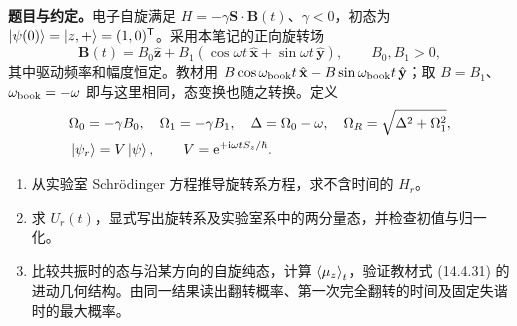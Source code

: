 \textbf{题目与约定。}电子自旋满足 $H=-\gamma\mathbf S\cdot\mathbf B(t)$、$\gamma<0$，初态为 $\left|\psi(0)\right\rangle=\left|z,+\right\rangle=(1,0)^{\mathsf T}$。采用本笔记的正向旋转场
\begin{equation}
  \mathbf B(t)=B_0\hat{\mathbf z}
    +B_1(\cos\omega t\,\hat{\mathbf x}+\sin\omega t\,\hat{\mathbf y}),
  \qquad B_0,B_1>0,
\end{equation}
其中驱动频率和幅度恒定。教材用 $B\cos\omega_{\rm book}t\,\hat{\mathbf x}-B\sin\omega_{\rm book}t\,\hat{\mathbf y}$；取 $B=B_1$、$\omega_{\rm book}=-\omega$ 即与这里相同，态变换也随之转换。定义
\begin{align}
  &\Omega_0=-\gamma B_0,\quad \Omega_1=-\gamma B_1,\quad
  \Delta=\Omega_0-\omega,\quad \Omega_R=\sqrt{\Delta^2+\Omega_1^2},\\
  &\left|\psi_r\right\rangle=V\left|\psi\right\rangle,\qquad V=\mathrm{e}^{+\mathrm{i}\omega tS_z/\hbar}.
\end{align}
\begin{enumerate}
  \item 从实验室 Schrödinger 方程推导旋转系方程，求不含时间的 $H_r$。
  \item 求 $U_r(t)$，显式写出旋转系及实验室系中的两分量态，并检查初值与归一化。
  \item 比较共振时的态与沿某方向的自旋纯态，计算 $\left\langle \mu_z \right\rangle_t$，验证教材式 (14.4.31) 的进动几何结构。由同一结果读出翻转概率、第一次完全翻转的时间及固定失谐时的最大概率。
\end{enumerate}

